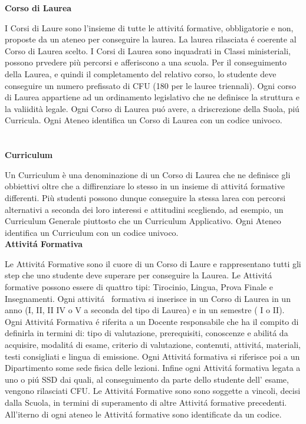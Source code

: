\documentclass[a4paper,12pt,italian,towside]{article}
\begin{document}
\textbf{Corso di Laurea}
\par
\textcolor{red!50} { I Corsi di Laure sono l'insieme di tutte le attivit\'a formative, obbligatorie e non, proposte da un ateneo per conseguire la laurea. La laurea rilasciata \'e coerente al Corso di Laurea scelto. I Corsi di Laurea sono inquadrati in Classi ministeriali, possono prvedere più percorsi e afferiscono a una scuola. Per il conseguimento della Laurea, e quindi il completamento del relativo corso, lo studente deve conseguire un numero prefissato di CFU (180 per le lauree triennali). Ogni corso di Laurea appartiene ad un ordinamento legislativo che ne definisce la struttura e la valiidità legale. Ogni Corso di Laurea pu\'o avere, a driscrezione della Suola, pi\'u Curricula. Ogni Ateneo identifica un Corso di Laurea con un codice univoco.
} 
\\
\\
\\


\textbf{Curriculum}
\par
\textcolor{red!50} { Un Curriculum è una denominazione di un Corso di Laurea che ne definisce gli obbiettivi oltre che a diffirenziare lo stesso in un insieme di attivit\'a formative differenti. Più studenti possono dunque conseguire la stessa larea con percorsi alternativi a seconda dei loro interessi e attitudini scegliendo, ad esempio, un Curriculum Generale piuttosto che un Curriculum Applicativo.
Ogni Ateneo identifica un Curriculum con un codice univoco.
} 
\\


\textbf{Attivit\'a Formativa}
\par
\textcolor{red!50} {Le Attivit\'a Formative sono il cuore di un Corso di Laure e rappresentano tutti gli step che uno studente deve superare per conseguire la Laurea. Le Attivit\'a formative possono essere di quattro tipi: Tirocinio, Lingua, Prova Finale e Insegnamenti. Ogni attivit\'a  formativa si inserisce in un Corso di Laurea in un anno (I, II, II IV o V a seconda del tipo di Laurea) e in un semestre ( I o II). Ogni Attivit\'a Formativa \'e riferita a un Docente responsabile che ha il compito di definirla in termini di: tipo di valutazione, prerequisiti, conoscenze e abilit\'a da acquisire, modalit\'a di esame, criterio di valutazione, contenuti, attivit\'a, materiali, testi consigliati e lingua di emissione. Ogni Attivit\'a formativa si riferisce poi a un Dipartimento some sede fisica delle lezioni. Infine ogni Attivit\'a formativa  legata a uno o pi\'u SSD dai quali, al conseguimento da parte dello studente dell' esame, vengono rilasciati CFU. Le Attivit\'a Formative sono sono soggette a vincoli, decisi dalla Scuola, in termini di superamento di altre Attivit\'a formative precedenti. All'iterno di ogni ateneo le Attivit\'a formative sono identificate da un codice.
} 
\\
\end{document}
